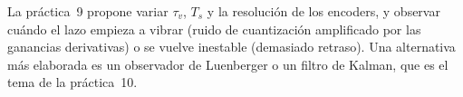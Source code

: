 \begin{nota}
La práctica~9 propone variar $\tau_v$, $T_s$ y la resolución de los encoders, y observar cuándo el lazo empieza a vibrar (ruido de cuantización amplificado por las ganancias derivativas) o se vuelve inestable (demasiado retraso). Una alternativa más elaborada es un observador de Luenberger o un filtro de Kalman, que es el tema de la práctica~10.
\end{nota}
